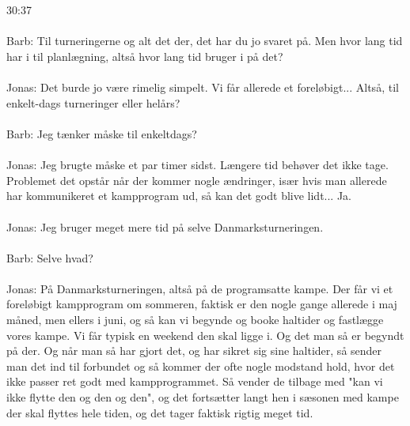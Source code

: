 \\\\
30:37
\\\\
Barb: Til turneringerne og alt det der, det har du jo svaret på. Men hvor lang tid har i til planlægning, altså hvor lang tid bruger i på det?
\\\\
Jonas: Det burde jo være rimelig simpelt. Vi får allerede et foreløbigt... Altså, til enkelt-dags turneringer eller helårs?
\\\\
Barb: Jeg tænker måske til enkeltdags? 
\\\\
Jonas: Jeg brugte måske et par timer sidst. Længere tid behøver det ikke tage. Problemet det opstår når der kommer nogle ændringer, især hvis man allerede har kommunikeret et kampprogram ud, så kan det godt blive lidt... Ja.
\\\\
Jonas: Jeg bruger meget mere tid på selve Danmarksturneringen.
\\\\
Barb: Selve hvad?
\\\\
Jonas: På Danmarksturneringen, altså på de programsatte kampe. Der får vi et foreløbigt kampprogram om sommeren, faktisk er den nogle gange allerede i maj måned, men ellers i juni, og så kan vi begynde og booke haltider og fastlægge vores kampe. Vi får typisk en weekend den skal ligge i. Og det man så er begyndt på der. Og når man så har gjort det, og har sikret sig sine haltider, så sender man det ind til forbundet og så kommer der ofte nogle modstand hold, hvor det ikke passer ret godt med kampprogrammet. Så vender de tilbage med "kan vi ikke flytte den og den og den", og det fortsætter langt hen i sæsonen med kampe der skal flyttes hele tiden, og det tager faktisk rigtig meget tid.
